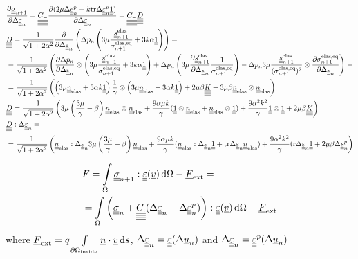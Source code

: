 \documentclass[12pt]{article}
\begin{document}
\begin{appendices}
    \begin{align}
        & \frac{\partial\uusigman}{\partial \Deltaeps} = \uuuuC - \frac{\partial (2\mu\Deltaep + k\mtr\Deltaepsp\uuUnit)}{\partial\Deltaeps} = \uuuuC - \uuuuD \\
        & \uuuuD = \frac{1}{\sqrt{1 + 2\alpha^2}} \frac{\partial }{\partial \Deltaeps} \left( \Delta p_n \left( 3\mu \frac{\uusnelas}{\sigmaeqnelas} + 3k\alpha \uuUnit  \right) \right) = \\
        & = \frac{1}{\sqrt{1 + 2\alpha^2}}\left( \frac{\partial\Delta p_n}{\partial\Deltaeps} \otimes \left( 3\mu\frac{\uusnelas}{\sigmaeqnelas} + 3k\alpha \uuUnit \right) + \Delta p_n \left(3\mu\frac{\partial\uusnelas}{\partial\Deltaeps}\frac{1}{\sigmaeqnelas} \right) - \Delta p_n 3\mu\frac{\uusnelas}{(\sigmaeqnelas)^2} \otimes \frac{\partial\sigmaeqnelas}{\partial\Deltaeps}\right) = \\
        & = \frac{1}{\sqrt{1 + 2\alpha^2}}\left( \left( 3\mu \uunelas + 3\alpha k \uuUnit \right) \frac{1}{\gamma} \otimes \left( 3\mu \uunelas + 3\alpha k \uuUnit \right) + 2\mu\beta\uuuuK - 3\mu\beta\uunelas \otimes \uunelas \right) \\
        & \uuuuD = \frac{1}{\sqrt{1 + 2\alpha^2}}\left( 3\mu\left(\frac{3\mu}{\gamma} - \beta\right)\uunelas \otimes \uunelas + \frac{9\alpha\mu k}{\gamma} (\uuUnit \otimes \uunelas + \uunelas \otimes \uuUnit) + \frac{9\alpha^2k^2}{\gamma} \uuUnit \otimes \uuUnit + 2\mu\beta \uuuuK \right) \\
        & \uuuuD : \Deltaeps = \\
        & = \frac{1}{\sqrt{1 + 2\alpha^2}}\left( \uunelas : \Deltaeps 3\mu \left( \frac{3\mu}{\gamma} - \beta \right) \uunelas + \frac{9\alpha\mu k}{\gamma} (\uunelas : \Deltaeps \uuUnit + \mtr\Deltaeps \uunelas) + \frac{9\alpha^2k^2}{\gamma} \mtr \Deltaeps \uuUnit + 2\mu\beta \Deltaep \right)  \\
    \end{align}

    \begin{align}
        & F = \int\limits_\Omega \uusigman : \uueps(\uv) \, \md\Omega - \uF_\text{ext} = \\ 
        & = \int\limits_\Omega \left( \uusigma_n + \uuuuC : (\Deltaeps - \Deltaeps^p) \right) : \uueps(\uv) \, \md\Omega - \uF_\text{ext} 
    \end{align}
    where $\uF_\text{ext} = q \int\limits_{\partial\Omega_\text{inside}}\un \cdot \uv \, \md s $, $\Deltaeps = \uueps(\Delta\uu_n)$ and $\Deltaeps = \uueps^p(\Delta\uu_n)$


\end{appendices}
\end{document}
